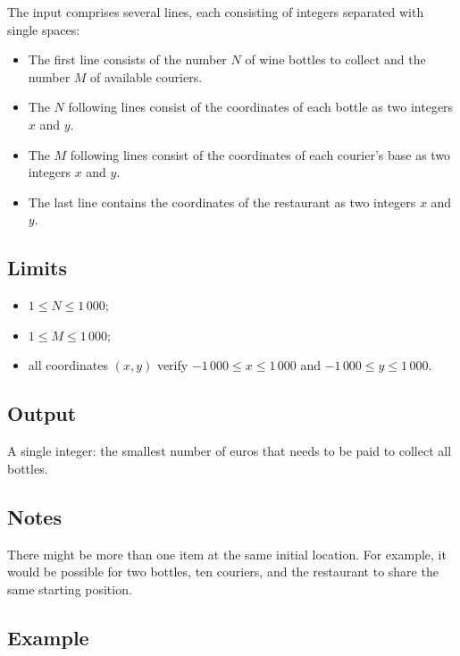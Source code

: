The input comprises several lines, each consisting of integers
separated with single spaces:
\begin{itemize}
\item The first line consists of the number $N$ of
wine bottles to collect and the number  $M$
of available couriers.

\item The $N$ following lines consist of the coordinates of each bottle as
two integers $x$ and $y$.

\item The $M$ following lines consist of the coordinates of each
  courier's base
as two integers $x$ and $y$.

\item The last line contains the coordinates of the restaurant as two
  integers $x$ and $y$.
\end{itemize}

\subsection*{Limits}
\begin{itemize}
  \item $1 \leq N \leq 1\,000$;
  \item $1 \leq M \leq 1\,000$;
  \item all coordinates $(x,y)$ verify $-1\,000 \leq x \leq 1\,000$ and
$-1\,000 \leq y \leq 1\,000$.
\end{itemize}

\subsection*{Output}

A single integer: the smallest number of euros that needs to be
paid to collect all bottles.


\subsection*{Notes}

There might be more than one item at the same initial location. For
example, it would be possible for two bottles, ten couriers, and the
restaurant to share the same starting position.

\subsection*{Example}

